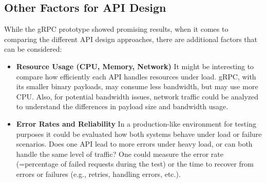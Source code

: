 \subsection{Other Factors for API Design}

While the gRPC prototype showed promising results, when it comes to comparing the different \ac{API} design approaches, there are additional factors that can be considered:

\begin{itemize}
    \item \textbf{Resource Usage (CPU, Memory, Network)}
    It might be interesting to compare how efficiently each \ac{API} handles resources under load. gRPC, with its smaller binary payloads, may consume less bandwidth, but may use more CPU. 
    Also, for potential bandwidth issues, network traffic could be analyzed to understand the differences in payload size and bandwidth usage.
    
    \item \textbf{Error Rates and Reliability}
    In a production-like environment for testing purposes it could be evaluated how both systems behave under load or failure scenarios. Does one \ac{API} lead to more errors under heavy load, or can both handle the same level of traffic? One could measure the error rate (=percentage of failed requests during the test) or the time to recover from errors or failures (e.g., retries, handling errors, etc.).
\end{itemize}
